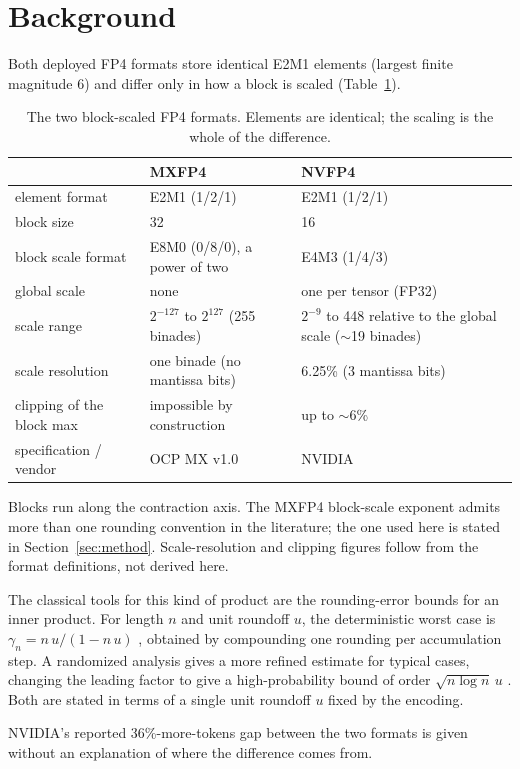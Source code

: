 \section{Background}
\label{sec:background}

Both deployed FP4 formats store identical E2M1 elements (largest finite magnitude
6) and differ only in how a block is scaled (Table~\ref{tab:formats}).

\begin{table}[t]
  \centering
  \caption{The two block-scaled FP4 formats. Elements are identical; the scaling
    is the whole of the difference.}
  \label{tab:formats}
  \begin{tabular}{@{}l p{3.4cm} p{4.2cm}@{}}
    \toprule
                              & MXFP4                          & NVFP4 \\
    \midrule
    element format            & E2M1 (1/2/1)                    & E2M1 (1/2/1) \\
    block size                & 32                             & 16 \\
    block scale format        & E8M0 (0/8/0), a power of two    & E4M3 (1/4/3) \\
    global scale              & none                           & one per tensor (FP32) \\
    scale range               & $2^{-127}$ to $2^{127}$ (255 binades) & $2^{-9}$ to 448 relative to the global scale ($\sim$19 binades) \\
    scale resolution          & one binade (no mantissa bits)  & 6.25\% (3 mantissa bits) \\
    clipping of the block max  & impossible by construction     & up to $\sim$6\% \\
    specification / vendor    & OCP MX v1.0 \citep{ocp2023mx}   & NVIDIA \citep{nvidia2026nvfp4} \\
    \bottomrule
  \end{tabular}

  \vspace{0.6em}
  {\footnotesize Blocks run along the contraction axis. The MXFP4 block-scale
  exponent admits more than one rounding convention in the literature; the one
  used here is stated in Section~\ref{sec:method}. Scale-resolution and clipping
  figures follow from the format definitions, not derived here.}
\end{table}

The classical tools for this kind of product are the rounding-error bounds for an
inner product. For length $n$ and unit roundoff $u$, the deterministic worst case
is
$\gamma_n = n\,u/(1-n\,u)$ \citep{higham2002accuracy}, obtained by compounding one
rounding per accumulation step. A randomized analysis gives a more refined
estimate for typical cases, changing the leading factor to give a high-probability
bound of order $\sqrt{n \log n}\,u$ \citep{higham2019new}. Both are stated in
terms of a single unit roundoff $u$ fixed by the encoding.

NVIDIA's reported 36\%-more-tokens gap between the two formats
\citep{nvidia2026nvfp4} is given without an explanation of where the difference
comes from.
